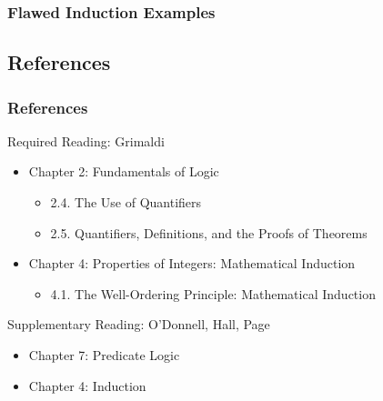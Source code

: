 \documentclass[dvipsnames]{beamer}
\begin{document}

\begin{frame}
  \frametitle{Flawed Induction Examples}

  \begin{center}
  \end{center}
\end{frame}

\subsection*{References}

\begin{frame}
  \frametitle{References}

  \begin{block}{Required Reading: Grimaldi}
    \begin{itemize}
      \item Chapter 2: Fundamentals of Logic
      \begin{itemize}
        \item 2.4. \alert{The Use of Quantifiers}
        \item 2.5. \alert{Quantifiers, Definitions, and the Proofs of Theorems}
      \end{itemize}
      \item Chapter 4: Properties of Integers: Mathematical Induction
      \begin{itemize}
        \item 4.1. \alert{The Well-Ordering Principle: Mathematical Induction}
      \end{itemize}
    \end{itemize}
  \end{block}

  \begin{block}{Supplementary Reading: O'Donnell, Hall, Page}
    \begin{itemize}
      \item Chapter 7: Predicate Logic
      \item Chapter 4: Induction
    \end{itemize}
  \end{block}
\end{frame}
\end{document}

